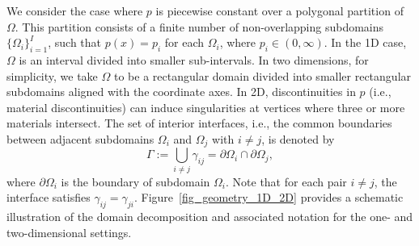 \documentclass[oneside]{article}
\begin{document}
\noindent We consider the case where $p$ is piecewise constant over a polygonal partition of $\Omega$. This partition consists of a finite number of non-overlapping subdomains $\{\Omega_i\}_{i=1}^I$, such that $p(x) = p_i$ for each $\Omega_i$, where $p_i \in (0, \infty)$. 
In the 1D case, $\Omega$ is an interval divided into smaller sub-intervals. In two dimensions, for simplicity, we take $\Omega$ to be a rectangular domain divided into smaller rectangular subdomains aligned with the coordinate axes. In 2D, discontinuities in $p$ (i.e., material discontinuities) can induce singularities at vertices where three or more materials intersect. The set of interior interfaces, i.e., the common boundaries between adjacent subdomains $\Omega_i$ and $\Omega_j$ with $i \ne j$, is denoted by
\begin{equation}
\Gamma := \bigcup_{i \neq j} \gamma_{ij} = \partial\Omega_i \cap \partial\Omega_j,
\end{equation}
where \( \partial \Omega_i \) is the boundary of subdomain \( \Omega_i \).
Note that for each pair \( i \ne j \), the interface satisfies \( \gamma_{ij} = \gamma_{ji} \). Figure~\ref{fig_geometry_1D_2D} provides a schematic illustration of the domain decomposition and associated notation for the one- and two-dimensional settings. 
\end{document}
